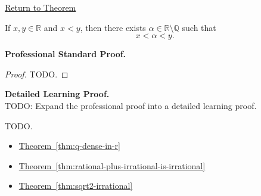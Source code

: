 \newpage
{}
\label{prf:between-any-two-reals-is-an-irrational}

\begin{remark*}[Return]
\hyperref[thm:between-any-two-reals-is-an-irrational]{Return to Theorem}
\end{remark*}

\begin{theorem*}
If $x,y\in\mathbb{R}$ and $x<y$, then there exists
$\alpha\in\mathbb{R}\setminus\mathbb{Q}$ such that
\[
x<\alpha<y.
\]
\end{theorem*}

\textbf{Professional Standard Proof.}~\\
\begin{proof}
TODO.
\end{proof}

\textbf{Detailed Learning Proof.}~\\
TODO: Expand the professional proof into a detailed learning proof.


\begin{remark*}
TODO.
\end{remark*}

\begin{dependencies}
\begin{itemize}
  \item \hyperref[thm:q-dense-in-r]{Theorem~\ref*{thm:q-dense-in-r}}
  \item \hyperref[thm:rational-plus-irrational-is-irrational]{Theorem~\ref*{thm:rational-plus-irrational-is-irrational}}
  \item \hyperref[thm:sqrt2-irrational]{Theorem~\ref*{thm:sqrt2-irrational}}
\end{itemize}
\end{dependencies}

